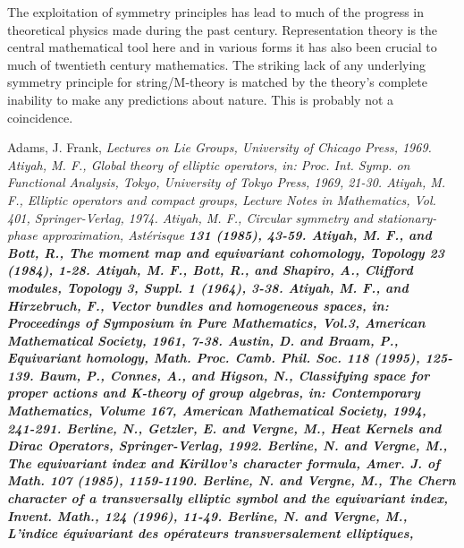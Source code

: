 \documentclass[a4paper,a4paper]{article}
\theoremstyle{conjecture}
\begin{document}
The exploitation of symmetry principles has lead to much of the
progress in theoretical physics made during the past century.  Representation
theory is the central mathematical tool here and in various forms it
has also been crucial to much of twentieth century mathematics.
The striking lack of any underlying symmetry principle for string/M-theory is matched by the
theory's complete inability to make any predictions about nature.  This is probably
not a coincidence.


\begin{thebibliography}{99}
\rm Adams, J. Frank, \it Lectures on Lie Groups, \rm University of
Chicago Press, 1969.
\rm Atiyah, M. F.,
\rm Global theory of elliptic operators, in:
\it Proc. Int. Symp. on Functional Analysis, Tokyo,
\rm University of Tokyo Press, 1969, 21-30.
\rm Atiyah, M. F.,
\rm Elliptic operators and compact groups,
\it Lecture Notes in Mathematics, Vol. 401,
\rm Springer-Verlag, 1974.
\rm Atiyah, M. F.,
\rm Circular symmetry and stationary-phase approximation,
\it Ast\'erisque \bf 131
\rm (1985), 43-59.
\rm Atiyah, M. F., and Bott, R.,
\rm The moment map and equivariant cohomology,
\it Topology \bf 23
\rm (1984), 1-28.
\rm Atiyah, M. F., Bott, R., and Shapiro, A., \rm Clifford modules,
\it Topology \bf 3, Suppl. 1 \rm (1964), 3-38.
\rm Atiyah, M. F., and Hirzebruch, F.,
\rm Vector bundles and homogeneous spaces, in:
\it Proceedings of Symposium in Pure Mathematics, Vol.3,
\rm American Mathematical Society, 1961, 7-38.
\rm Austin, D. and Braam, P.,
\rm Equivariant homology,
\it Math. Proc. Camb. Phil. Soc.
\bf 118
\rm (1995), 125-139.
\rm Baum, P., Connes, A., and Higson, N.,
\rm Classifying space for proper actions and K-theory of group \coordHE{} algebras, in:
\it Contemporary Mathematics, Volume 167,
\rm American Mathematical Society, 1994, 241-291.
\rm Berline, N., Getzler, E. and Vergne, M.,
\it Heat Kernels and
Dirac Operators, \rm Springer-Verlag, 1992.
\rm Berline, N. and Vergne, M.,
\rm The equivariant index and Kirillov's character formula,
\it Amer. J. of Math.
\bf 107
\rm (1985), 1159-1190.
\rm Berline, N. and Vergne, M.,
\rm The Chern character of a transversally elliptic symbol and the equivariant index,
\it Invent. Math.,
\bf 124
\rm (1996), 11-49.
\rm Berline, N. and Vergne, M.,
\rm L'indice \'equivariant des op\'erateurs transversalement elliptiques,

\end{thebibliography}
\end{document}

